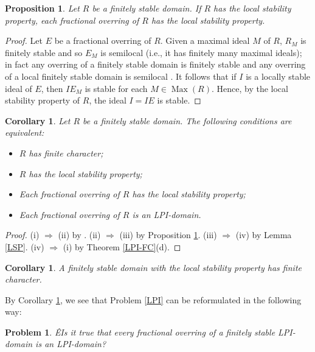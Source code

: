 \documentclass[12pt]{amsart}
\newtheorem{proposition}[theorem]{Proposition}
\newtheorem{corollary}[theorem]{Corollary}
\newtheorem{Qu}{Problem}
\theoremstyle{definition}
\begin{document}
\begin{proposition} \label{LSover} Let $R$ be a finitely stable domain. If $R$ has the local stability property, each fractional overring of $R$ has the local stability property.
\end{proposition}
\begin{proof} Let  $E$ be a fractional overring of $R$. Given a maximal ideal $M$ of $R$, $R_M$ is finitely stable and so $E_M$ is semilocal (i.e., it has finitely many maximal ideals); in fact any overring of a finitely stable domain is finitely stable and any overring of a local finitely stable domain is semilocal \cite[Lemma 2.4 and Corollary 2.5]{O2}. 
It follows that if $I$ is a locally stable ideal of $E$, then $IE_M$ is stable for each $M\in \operatorname{Max}(R)$. Hence, by the local stability property of $R$, the ideal $I=IE$ is stable.
\end{proof}

\begin{corollary} \label{corFC} 
Let $R$ be a finitely stable domain. The following conditions are equivalent:
\begin{itemize}
\item[(i)] $R$ has finite character;
\item[(ii)]  $R$ has the local stability property;
\item[(iii)] Each fractional overring of $R$ has the local stability property;
\item[(iv)] Each fractional overring of $R$ is an LPI-domain.
\end{itemize}
\end{corollary}

\begin{proof} (i) ${\Rightarrow}$ (ii) by \cite[Lemma 4.3]{O3}. (ii) ${\Rightarrow}$ (iii) by Proposition \ref{LSover}. 
(iii) ${\Rightarrow}$ (iv) by Lemma \ref{LSP}. (iv) ${\Rightarrow}$ (i) by Theorem \ref{LPI-FC}(d). 
\end{proof}

 \begin{corollary} \cite[Theorem 4.5]{B4} A finitely stable domain with the local stability property has finite character. 
 \end{corollary}

By Corollary \ref{corFC}, we see that Problem \ref{LPI} can be reformulated in the following way:

\begin{Qu}  \label{QuLSI}ÊIs it true that every fractional overring of a finitely stable LPI-domain is an LPI-domain?
\end{Qu}
\end{document}
